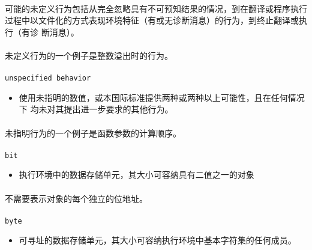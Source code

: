 \paragraph{}
\notes* 可能的未定义行为包括从完全忽略具有不可预知结果的情况，到在翻译或程序执行
过程中以文件化的方式表现环境特征（有或无诊断消息）的行为，到终止翻译或执行（有诊
断消息）。

\paragraph{}
\ex* 未定义行为的一个例子是整数溢出时的行为。

\paragraph{}
\texttt{unspecified behavior}
\begin{itemize}
  \item[]{使用未指明的数值，或本国际标准提供两种或两种以上可能性，且在任何情况下
    均未对其提出进一步要求的其他行为。}
\end{itemize}

\paragraph{}
\ex* 未指明行为的一个例子是函数参数的计算顺序。

\paragraph{}
\texttt{bit}
\begin{itemize}
  \item[]{执行环境中的数据存储单元，其大小可容纳具有二值之一的对象}
\end{itemize}

\paragraph{}
\notes* 不需要表示对象的每个独立的位地址。

\paragraph{}
\texttt{byte}
\begin{itemize}
  \item[]{可寻址的数据存储单元，其大小可容纳执行环境中基本字符集的任何成员。}
\end{itemize}

